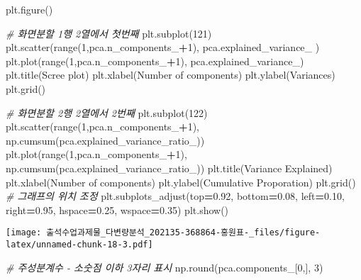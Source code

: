 \documentclass[
]{article}
\newenvironment{Shaded}{\begin{snugshade}}{\end{snugshade}}
\newcommand{\BuiltInTok}[1]{#1}
\newcommand{\CommentTok}[1]{\textcolor[rgb]{0.56,0.35,0.01}{\textit{#1}}}
\newcommand{\DecValTok}[1]{\textcolor[rgb]{0.00,0.00,0.81}{#1}}
\newcommand{\FloatTok}[1]{\textcolor[rgb]{0.00,0.00,0.81}{#1}}
\newcommand{\NormalTok}[1]{#1}
\newcommand{\OperatorTok}[1]{\textcolor[rgb]{0.81,0.36,0.00}{\textbf{#1}}}
\newcommand{\StringTok}[1]{\textcolor[rgb]{0.31,0.60,0.02}{#1}}
\begin{document}
\begin{Shaded}
\begin{Highlighting}[]
\NormalTok{plt.figure()}

\CommentTok{\# 화면분할 1행 2열에서 첫번째}
\NormalTok{plt.subplot(}\DecValTok{121}\NormalTok{)}
\NormalTok{plt.scatter(}\BuiltInTok{range}\NormalTok{(}\DecValTok{1}\NormalTok{,pca.n\_components\_}\OperatorTok{+}\DecValTok{1}\NormalTok{), pca.explained\_variance\_ )}
\NormalTok{plt.plot(}\BuiltInTok{range}\NormalTok{(}\DecValTok{1}\NormalTok{,pca.n\_components\_}\OperatorTok{+}\DecValTok{1}\NormalTok{), pca.explained\_variance\_)}
\NormalTok{plt.title(}\StringTok{\textquotesingle{}Scree plot\textquotesingle{}}\NormalTok{)}
\NormalTok{plt.xlabel(}\StringTok{\textquotesingle{}Number of components\textquotesingle{}}\NormalTok{)}
\NormalTok{plt.ylabel(}\StringTok{\textquotesingle{}Variances\textquotesingle{}}\NormalTok{)}
\NormalTok{plt.grid()}

\CommentTok{\# 화면분할 2행 2열에서 2번째}
\NormalTok{plt.subplot(}\DecValTok{122}\NormalTok{)}
\NormalTok{plt.scatter(}\BuiltInTok{range}\NormalTok{(}\DecValTok{1}\NormalTok{,pca.n\_components\_}\OperatorTok{+}\DecValTok{1}\NormalTok{), np.cumsum(pca.explained\_variance\_ratio\_))}
\NormalTok{plt.plot(}\BuiltInTok{range}\NormalTok{(}\DecValTok{1}\NormalTok{,pca.n\_components\_}\OperatorTok{+}\DecValTok{1}\NormalTok{), np.cumsum(pca.explained\_variance\_ratio\_))}
\NormalTok{plt.title(}\StringTok{\textquotesingle{}Variance Explained\textquotesingle{}}\NormalTok{)}
\NormalTok{plt.xlabel(}\StringTok{\textquotesingle{}Number of components\textquotesingle{}}\NormalTok{)}
\NormalTok{plt.ylabel(}\StringTok{\textquotesingle{}Cumulative Proporation\textquotesingle{}}\NormalTok{)}
\NormalTok{plt.grid()}
\CommentTok{\# 그래프의 위치 조정}
\NormalTok{plt.subplots\_adjust(top}\OperatorTok{=}\FloatTok{0.92}\NormalTok{, bottom}\OperatorTok{=}\FloatTok{0.08}\NormalTok{, left}\OperatorTok{=}\FloatTok{0.10}\NormalTok{, right}\OperatorTok{=}\FloatTok{0.95}\NormalTok{, hspace}\OperatorTok{=}\FloatTok{0.25}\NormalTok{, wspace}\OperatorTok{=}\FloatTok{0.35}\NormalTok{)}
\NormalTok{plt.show()}
\end{Highlighting}
\end{Shaded}

\texttt{[image: 출석수업과제물\_다변량분석\_202135-368864-홍원표-\_files/figure-latex/unnamed-chunk-18-3.pdf]}

\begin{Shaded}
\begin{Highlighting}[]
\CommentTok{\# 주성분계수 {-} 소숫점 이하 3자리 표시}
\NormalTok{np.}\BuiltInTok{round}\NormalTok{(pca.components\_[}\DecValTok{0}\NormalTok{,], }\DecValTok{3}\NormalTok{)}
\end{Highlighting}
\end{Shaded}
\end{document}
